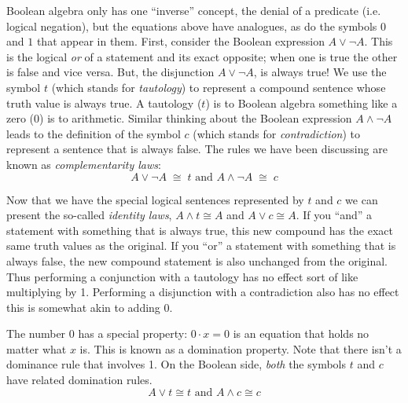 \documentclass[10pt,]{book}
\theoremstyle{plain}
\theoremstyle{definition}
\theoremstyle{definition}
\numberwithin{equation}{section}
\begin{document}
    Boolean algebra only has one ``inverse'' concept, the denial
    of a predicate (i.e. logical negation), but the equations above have analogues, as do
    the symbols \(0\) and \(1\) that appear in them. First, consider
    the Boolean expression \(A \lor {\lnot}A\). This is the logical \emph{or}
    of a statement and its exact opposite; when one is true the other is
    false and vice versa. But, the disjunction \(A \lor {\lnot}A\), is
    always true! We use the symbol \(t\) (which stands for
    \emph{tautology})
    to represent a compound sentence whose truth value is always true.
    A tautology (\(t\)) is to Boolean algebra something like a zero (\(0\))
    is to arithmetic. Similar thinking about the Boolean expression
    \(A \land {\lnot}A\) leads to the definition of the symbol \(c\) (which
    stands for \emph{contradiction}) to
    represent a sentence that is always
    false. The rules we have been discussing are known as
    \emph{complementarity laws}:
    \begin{equation*}
      A \lor {\lnot}A \; \cong \; t \mbox{ and } 
      A \land {\lnot}A \; \cong \; c
    \end{equation*}
\par

    Now that we have the special logical sentences represented by \(t\) and \(c\)
    we can present the so-called \emph{identity laws},
    \(A \land t \cong A\) and
    \(A \lor c \cong A\). If you ``and'' a statement with something that is always
    true, this new compound has the exact same truth values as the original.
    If you ``or'' a statement with something that is always false, the new compound
    statement is also unchanged from the original. Thus performing a
    conjunction with a tautology has no effect \textemdash{} sort of like multiplying by 1.
    Performing a disjunction with a contradiction also has no effect \textemdash{} this is
    somewhat akin to adding 0.
\par

    The number 0 has a special property: \(0 \cdot x = 0\) is an equation that
    holds no matter what \(x\) is. This is known as a domination property. Note
    that there isn't a dominance rule that involves 1.
    On the Boolean side,
    \emph{both} the symbols \(t\) and \(c\) have related domination rules.
    \begin{equation*}
      A \lor t \cong t \mbox{ and }  
      A \land c \cong c
    \end{equation*}
\par
\end{document}
